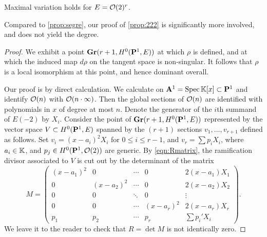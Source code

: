 \begin{proposition}\label{prop:222}
  Maximal variation holds for $E = \O(2)^r$.
\end{proposition}
Compared to \autoref{prop:segre}, our proof of \autoref{prop:222} is significantly more involved, and does not yield the degree.
\begin{proof}
  We exhibit a point $\Gr(r+1, H^0(\P^1, E))$ at which $\rho$ is defined, and at which the induced map $d\rho$ on the tangent space is non-singular.
  It follows that $\rho$ is a local isomorphism at this point, and hence dominant overall.

  Our proof is by direct calculation.
  We calculate on $\A^1 = \spec \k[x] \subset \P^1$ and identify $\O(n)$ with $\O(n \cdot \infty)$.
  Then the global sections of $\O(n)$ are identified with polynomials in $x$ of degree at most $n$.
  Denote the generator of the $i$th summand of $E(-2)$ by $X_i$.
  Consider the point of $\Gr(r+1, H^0(\P^1, E))$ represented by the vector space $V \subset H^0(\P^1, E)$ spanned by the $(r+1)$ sections $v_1, \dots, v_{r+1}$ defined as follows.
  Set $v_i = (x-a_i)^2 X_i$ for $0 \leq i \leq r-1$, and $v_r = \sum p_i X_i$, where $a_i \in \k$, and $p_j \in H^0(\P^1, \O(2))$ are generic.
  By \eqref{eqn:Rmatrix}, the ramification divisor associated to $V$ is cut out by the determinant of the matrix
  \[
    M =
    \begin{pmatrix}
      (x-a_1)^2 & 0 &  \cdots & 0 & 2(x-a_1)X_1\\
      0 & (x-a_2)^2 & \cdots & 0 & 2(x-a_2)X_2\\
      0 & 0 & \ddots & 0 & \vdots\\
      0 & 0 & \cdots & (x-a_r)^2& 2(x-a_r)X_r\\
      p_1 & p_2 & \cdots & p_r & \sum p_i' X_i
    \end{pmatrix}.
  \]
  We leave it to the reader to check that $R = \det M$ is not identically zero.


\end{proof}
